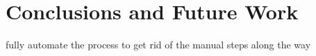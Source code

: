 \documentclass[11pt]{article}
\begin{document}












\section{Conclusions and Future Work}

fully automate the process to get rid of the manual steps along the way
\end{document}
